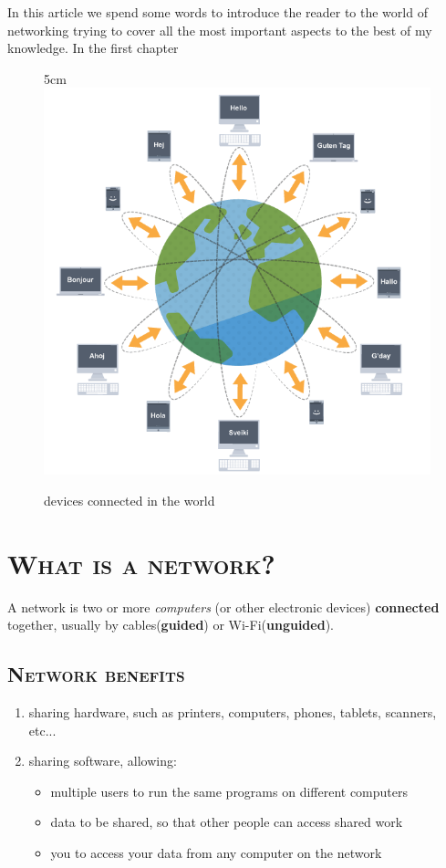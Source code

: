 \documentclass[a4paper,12pt]{book}
\begin{document}
In this article we spend some words to introduce the reader to the world of networking trying to cover all the most important aspects to the best of my knowledge. In the first chapter
\clearpage
\begin{figure}[21]{5cm}
\centering
\includegraphics[width=12cm]{./net.png}
\caption{devices connected in the world}\label{wrap-fig:1}
\end{figure}

\section{\textsc{What is a network?}}

A network is two or more \emph{computers} (or other electronic devices) \textbf{connected} together, usually by cables(\textbf{guided}) or Wi-Fi(\textbf{unguided}).



\subsection{\textsc{Network benefits}}
\begin{enumerate}
\item {sharing hardware, such as printers, computers, phones, tablets, scanners, etc...}\footnotemark{}
\item {sharing software, allowing:}
    \begin{itemize}
    \item{multiple users to run the same programs on different computers}
    \item{data to be shared, so that other people can access shared work}
    \item{you to access your data from any computer on the network}
    \end{itemize}
\end{enumerate}
\end{document}
